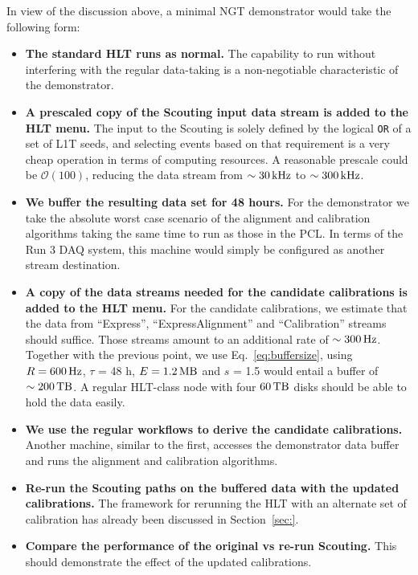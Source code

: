 In view of the discussion above, a minimal NGT demonstrator would take the following form:
\begin{itemize}
\item \textbf{The standard HLT runs as normal.} 
The capability to run without interfering with the regular data-taking is
a non-negotiable characteristic of the demonstrator.
\item \textbf{A prescaled copy of the Scouting input data stream is added to the HLT menu.}
The input to the Scouting is solely defined by the logical \texttt{OR} of a set of L1T seeds, and
selecting events based on that requirement is a very cheap operation in terms of computing resources.
A reasonable prescale could be $\mathcal{O}(100)$, reducing the data stream 
from $\sim 30\,\text{kHz}$
to $\sim 300\,\text{kHz}$.
\item \textbf{We buffer the resulting data set for 48 hours.}
For the demonstrator we take the absolute worst case scenario of the alignment and calibration algorithms taking the same time to run as those in the PCL.
In terms of the Run 3 DAQ system, this machine would simply be configured as another stream destination.
\item \textbf{A copy of the data streams needed for the candidate calibrations is added to the HLT menu.}
For the candidate calibrations, we estimate that 
the data from ``Express'', ``ExpressAlignment'' and ``Calibration'' streams should suffice.
Those streams amount to an additional rate of $\sim 300\,\text{Hz}$.
Together with the previous point, we
use Eq.~\ref{eq:buffersize}, using 
$R = 600\,\text{Hz}$,
$\tau$ = 48 h,
$E = 1.2\,\text{MB}$ and
$s$ = 1.5
would entail a buffer of $\sim 200\,\text{TB}$.
A regular HLT-class node with four $60\,\text{TB}$ disks should be able to hold the data easily.
\item \textbf{We use the regular workflows to derive the candidate calibrations.}
Another machine, similar to the first, accesses the demonstrator data buffer
and
runs the alignment and calibration algorithms.
\item \textbf{Re-run the Scouting paths on the buffered data with the updated calibrations.}
The framework for rerunning the HLT with an alternate set of calibration has already been discussed in Section~\ref{sec:}.
\item \textbf{Compare the performance of the original vs re-run Scouting.}
This should demonstrate the effect of the updated calibrations. 
\end{itemize}